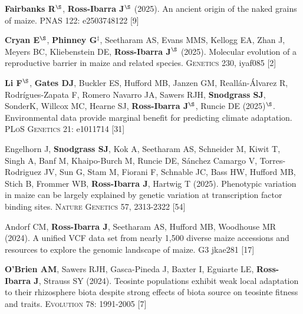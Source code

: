 \documentclass[letterpaper,10pt]{article}
\begin{document}
\begin{etaremune}
\item \textbf{Fairbanks R}$^\S$, \textbf{Ross-Ibarra J}$^\S$ (2025). An ancient origin of the naked grains of maize. \textsc{PNAS} 122: e2503748122 %
{} [9]\\

\item \textbf{Cryan E}$^\S$, \textbf{Phinney G}$^\ddagger$, Seetharam AS, Evans MMS, Kellogg EA, Zhan J, Meyers BC,  Kliebenstein DE, \textbf{Ross-Ibarra J}$^\S$ (2025). Molecular evolution of a reproductive barrier in maize and related species. \textsc{Genetics} 230, iyaf085 %
{} [2]\\

\item \textbf{Li F}$^\S$, \textbf{Gates DJ}, Buckler ES, Hufford MB, Janzen GM, Reall\'an-\'Alvarez R, Rodr\'igues-Zapata F, Romero Navarro JA, Sawers RJH, \textbf{Snodgrass SJ}, SonderK, Willcox MC, Hearne SJ, \textbf{Ross-Ibarra J}$^\S$, Runcie DE (2025)$^\S$.  Environmental data provide marginal benefit for predicting climate adaptation. \textsc{PLoS Genetics} 21: e1011714 %
{} [31]\\

\item Engelhorn J, \textbf{Snodgrass SJ}, Kok A, Seetharam AS, Schneider M, Kiwit T, Singh A, Banf M, Khaipo-Burch M, Runcie DE, Sánchez Camargo V, Torres-Rodriguez JV, Sun G, Stam M, Fiorani F, Schnable JC, Bass HW, Hufford MB, Stich B, Frommer WB, \textbf{Ross-Ibarra J}, Hartwig T (2025). Phenotypic variation in maize can be largely explained by genetic variation at transcription factor binding sites. \textsc{Nature Genetics} 57, 2313-2322 %
{} [54]\\

\item Andorf CM, \textbf{Ross-Ibarra J}, Seetharam AS, Hufford MB,  Woodhouse MR (2024). A unified VCF data set from nearly 1,500 diverse maize accessions and resources to explore the genomic landscape of maize. \textsc{G3} jkae281 %
{} [17]\\

\item \textbf{O'Brien AM},  Sawers RJH, Gasca-Pineda J, Baxter I, Eguiarte LE, \textbf{Ross-Ibarra J}, Strauss SY (2024).  Teosinte populations exhibit weak local adaptation to their rhizosphere biota despite strong effects of biota source on teosinte fitness and traits. \textsc{Evolution} 78: 1991-2005 %
{} [7]\\


\end{etaremune}
\end{document}
